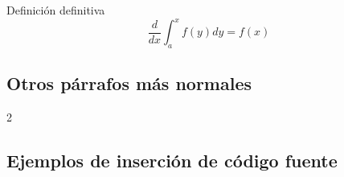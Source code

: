 	\begin{defn}
		Definición definitiva
		$$\frac{d}{dx}\int_a^xf(y)dy=f(x)$$
	\end{defn}

	\lipsum[115]

	\subsection{Otros párrafos más normales}

	\lipsum[7]


	\lipsum[4]

	\begin{multicols}{2}

		\lipsum[4]


		\lipsum[2-3]

	\end{multicols}

\subsection{Ejemplos de inserción de código fuente}

	\newcommand{\insertsrcmanual}[2]{\href{https://latex.ppizarror.com/informe.html?srctype=#1\#hlp-srccode}{#2}}

